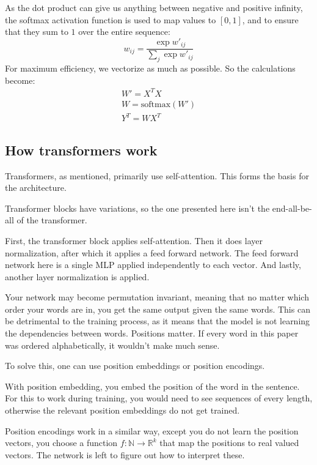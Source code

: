 As the dot product can give us anything between negative and positive infinity, the softmax activation function is used to map values to $[0,1]$, and to ensure that they sum to $1$ over the entire sequence:
$$
w_{ij}=\frac{\exp w'_{ij}}{\sum_{j}\exp w'_{ij}}
$$
For maximum efficiency, we vectorize as much as possible. So the calculations become:
\begin{gather}
W'=X^TX\\
W=\text{softmax}(W')\\
Y^T=WX^T
\end{gather}\cite{TransformersScratchPeterbloem}


\subsection{How transformers work}
Transformers, as mentioned, primarily use self-attention. This forms the basis for the architecture.

Transformer blocks have variations, so the one presented here isn't the end-all-be-all of the transformer.

First, the transformer block applies self-attention. Then it does layer normalization, after which it applies a feed forward network. The feed forward network here is a single MLP applied independently to each vector. And lastly, another layer normalization is applied.

Your network may become permutation invariant, meaning that no matter which order your words are in, you get the same output given the same words. This can be detrimental to the training process, as it means that the model is not learning the dependencies between words. Positions matter. If every word in this paper was ordered alphabetically, it wouldn't make much sense.

To solve this, one can use position embeddings or position encodings.

With position embedding, you embed the position of the word in the sentence. For this to work during training, you would need to see sequences of every length, otherwise the relevant position embeddings do not get trained.

Position encodings work in a similar way, except you do not learn the position vectors, you choose a function $f:\mathbb{N}\rightarrow\mathbb{R}^k$ that map the positions to real valued vectors. The network is left to figure out how to interpret these.\cite{TransformersScratchPeterbloem}